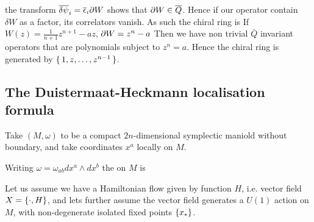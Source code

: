 \documentclass{article}
\begin{document}
\begin{example}
 the transform $\bar{\delta}\bar{\psi}_i = \bar{\eps}_i \del W$ shows that $\del W \in \bar{Q}$. Hence if our operator contain $\delta W$ as a factor, its correlators vanish. As such the chiral ring is 
  If  $W(z) = \frac{1}{n+1} z^{n+1}-az$, $\del W = z^n - a$
Then we have non trivial $\bar{Q}$ invariant operators that are polynomials subject to $z^n = a$. Hence the chiral ring is generated by $\set{1,z,\dots,z^{n-1}}$. 
\end{example}

\subsection{The Duistermaat-Heckmann localisation formula}
Take $(M,\omega)$ to be a compact $2n$-dimensional symplectic maniold without boundary, and take coordinates $x^a$ locally on $M$. 
\begin{definition}
	Writing $\omega = \omega_{ab}dx^a \wedge dx^b$ the  on $M$ is 
\end{definition}
Let us assume we have a Hamiltonian flow given by function $H$, i.e. vector field $X = \acomm[\cdot]{H}$, and lets further assume the vector field generates a $U(1)$ action on $M$, with non-degenerate isolated fixed points $\pbrace{x_\ast}$. 
\end{document}
